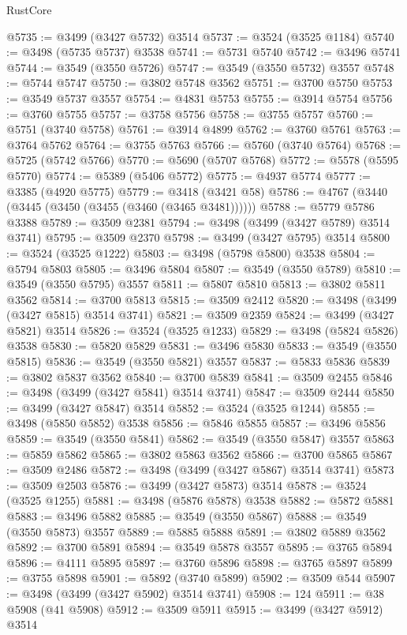 \begin{lexlean}{RustCore}
\begin{coremodule}
@5735 := @3499 (@3427 @5732) @3514
@5737 := @3524 (@3525 @1184)
@5740 := @3498 (@5735 @5737) @3538
@5741 := @5731 @5740
@5742 := @3496 @5741
@5744 := @3549 (@3550 @5726)
@5747 := @3549 (@3550 @5732) @3557
@5748 := @5744 @5747
@5750 := @3802 @5748 @3562
@5751 := @3700 @5750
@5753 := @3549 @5737 @3557
@5754 := @4831 @5753
@5755 := @3914 @5754
@5756 := @3760 @5755
@5757 := @3758 @5756
@5758 := @3755 @5757
@5760 := @5751 (@3740 @5758)
@5761 := @3914 @4899
@5762 := @3760 @5761
@5763 := @3764 @5762
@5764 := @3755 @5763
@5766 := @5760 (@3740 @5764)
@5768 := @5725 (@5742 @5766)
@5770 := @5690 (@5707 @5768)
@5772 := @5578 (@5595 @5770)
@5774 := @5389 (@5406 @5772)
@5775 := @4937 @5774
@5777 := @3385 (@4920 @5775)
@5779 := @3418 (@3421 @58)
@5786 := @4767 (@3440 (@3445 (@3450 (@3455 (@3460 (@3465 @3481))))))
@5788 := @5779 @5786 @3388
@5789 := @3509 @2381
@5794 := @3498 (@3499 (@3427 @5789) @3514 @3741)
@5795 := @3509 @2370
@5798 := @3499 (@3427 @5795) @3514
@5800 := @3524 (@3525 @1222)
@5803 := @3498 (@5798 @5800) @3538
@5804 := @5794 @5803
@5805 := @3496 @5804
@5807 := @3549 (@3550 @5789)
@5810 := @3549 (@3550 @5795) @3557
@5811 := @5807 @5810
@5813 := @3802 @5811 @3562
@5814 := @3700 @5813
@5815 := @3509 @2412
@5820 := @3498 (@3499 (@3427 @5815) @3514 @3741)
@5821 := @3509 @2359
@5824 := @3499 (@3427 @5821) @3514
@5826 := @3524 (@3525 @1233)
@5829 := @3498 (@5824 @5826) @3538
@5830 := @5820 @5829
@5831 := @3496 @5830
@5833 := @3549 (@3550 @5815)
@5836 := @3549 (@3550 @5821) @3557
@5837 := @5833 @5836
@5839 := @3802 @5837 @3562
@5840 := @3700 @5839
@5841 := @3509 @2455
@5846 := @3498 (@3499 (@3427 @5841) @3514 @3741)
@5847 := @3509 @2444
@5850 := @3499 (@3427 @5847) @3514
@5852 := @3524 (@3525 @1244)
@5855 := @3498 (@5850 @5852) @3538
@5856 := @5846 @5855
@5857 := @3496 @5856
@5859 := @3549 (@3550 @5841)
@5862 := @3549 (@3550 @5847) @3557
@5863 := @5859 @5862
@5865 := @3802 @5863 @3562
@5866 := @3700 @5865
@5867 := @3509 @2486
@5872 := @3498 (@3499 (@3427 @5867) @3514 @3741)
@5873 := @3509 @2503
@5876 := @3499 (@3427 @5873) @3514
@5878 := @3524 (@3525 @1255)
@5881 := @3498 (@5876 @5878) @3538
@5882 := @5872 @5881
@5883 := @3496 @5882
@5885 := @3549 (@3550 @5867)
@5888 := @3549 (@3550 @5873) @3557
@5889 := @5885 @5888
@5891 := @3802 @5889 @3562
@5892 := @3700 @5891
@5894 := @3549 @5878 @3557
@5895 := @3765 @5894
@5896 := @4111 @5895
@5897 := @3760 @5896
@5898 := @3765 @5897
@5899 := @3755 @5898
@5901 := @5892 (@3740 @5899)
@5902 := @3509 @544
@5907 := @3498 (@3499 (@3427 @5902) @3514 @3741)
@5908 := 124
@5911 := @38 @5908 (@41 @5908)
@5912 := @3509 @5911
@5915 := @3499 (@3427 @5912) @3514

\end{coremodule}
\end{lexlean}
